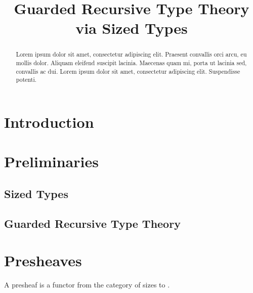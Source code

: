 \documentclass[a4paper,UKenglish,cleveref, autoref,numberwithinsect]{lipics-v2018}
\title{Guarded Recursive Type Theory via Sized Types}
\newcommand{\D}{\AgdaDatatype}
\begin{document}
\maketitle

\begin{abstract}
Lorem ipsum dolor sit amet, consectetur adipiscing elit. Praesent convallis orci arcu, eu mollis dolor. Aliquam eleifend suscipit lacinia. Maecenas quam mi, porta ut lacinia sed, convallis ac dui. Lorem ipsum dolor sit amet, consectetur adipiscing elit. Suspendisse potenti. 
 \end{abstract}

\section{Introduction}
\cite{atkey2013productive}

\section{Preliminaries}

\subsection{Sized Types}

\subsection{Guarded Recursive Type Theory}

\section{Presheaves}
A presheaf is a functor from the category of sizes to \D{Set}.
\end{document}
